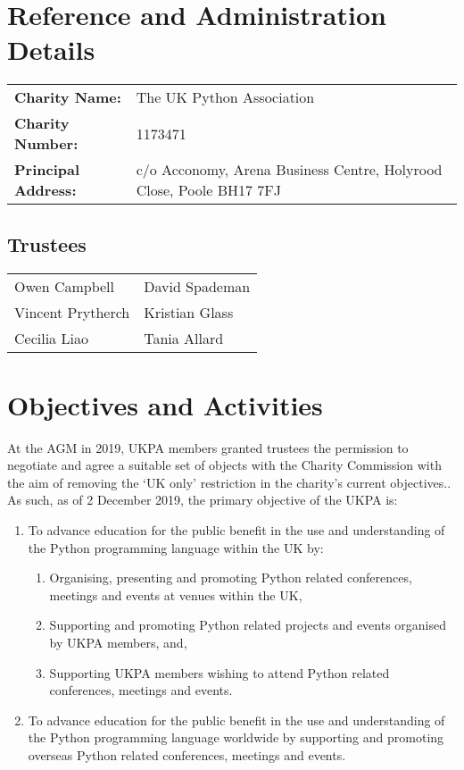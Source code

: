 \documentclass[11pt, final]{article}
\begin{document}

    \section{Reference and Administration Details}
    \begin{tabular}{l l}
        \textbf{Charity Name:} & The UK Python Association \\
        \textbf{Charity Number:} & 1173471 \\
        \textbf{Principal Address:} & c/o Acconomy, Arena Business Centre, Holyrood Close, Poole BH17 7FJ\\
    \end{tabular}

        \subsection{Trustees}
        \begin{tabular}{l l}
            Owen Campbell & David Spademan\\
            Vincent Prytherch & Kristian Glass\\
            Cecilia Liao & Tania Allard\\
        \end{tabular}

    \section{Objectives and Activities}
	At the AGM in 2019, UKPA members granted trustees the permission to negotiate and agree a suitable set of objects with the Charity Commission with the aim of removing the `UK only' restriction in the charity's current objectives.. As such, as of 2 December 2019, the primary objective of the UKPA is:

	\begin{enumerate}
		\item To advance education for the public benefit in the use and understanding of the Python programming language within the UK by:
		\begin{enumerate}
			\item Organising, presenting and promoting Python related conferences, meetings and events at venues within the UK,
			\item Supporting and promoting Python related projects and events organised by UKPA members, and,
			\item Supporting UKPA members wishing to attend Python related conferences, meetings and events.
		\end{enumerate}
		\item To advance education for the public benefit in the use and understanding of the Python programming language worldwide by supporting and promoting overseas Python related conferences, meetings and events.
	\end{enumerate}
\end{document}
